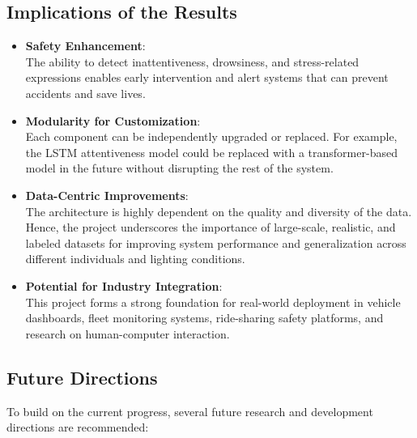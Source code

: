 \documentclass[
  letterpaper,
  DIV=11,
  numbers=noendperiod]{scrreport}
\begin{document}
\subsection{Implications of the
Results}\label{implications-of-the-results}

\begin{itemize}
\item
  \textbf{Safety Enhancement}:\\
  The ability to detect inattentiveness, drowsiness, and stress-related
  expressions enables early intervention and alert systems that can
  prevent accidents and save lives.
\item
  \textbf{Modularity for Customization}:\\
  Each component can be independently upgraded or replaced. For example,
  the LSTM attentiveness model could be replaced with a
  transformer-based model in the future without disrupting the rest of
  the system.
\item
  \textbf{Data-Centric Improvements}:\\
  The architecture is highly dependent on the quality and diversity of
  the data. Hence, the project underscores the importance of
  large-scale, realistic, and labeled datasets for improving system
  performance and generalization across different individuals and
  lighting conditions.
\item
  \textbf{Potential for Industry Integration}:\\
  This project forms a strong foundation for real-world deployment in
  vehicle dashboards, fleet monitoring systems, ride-sharing safety
  platforms, and research on human-computer interaction.
\end{itemize}

\subsection{Future Directions}\label{future-directions}

To build on the current progress, several future research and
development directions are recommended:
\end{document}
